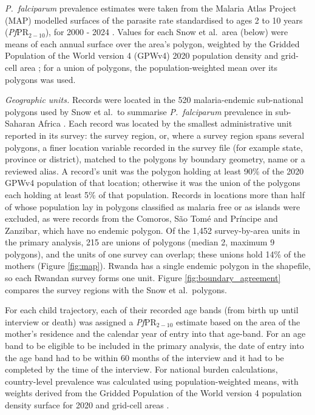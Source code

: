 \documentclass[12pt]{article}
\begin{document}
\emph{P.\ falciparum} prevalence estimates were taken from the Malaria Atlas Project (MAP) modelled surfaces of the parasite rate standardised to ages 2 to 10 years (\textit{Pf}PR$_{2-10}$), for 2000 - 2024 \cite{map,map2025}. Values for each Snow et al.\ area (below) were means of each annual surface over the area's polygon, weighted by the Gridded Population of the World version 4 (GPWv4) 2020 population density and grid-cell area \cite{gpwv4}; for a union of polygons, the population-weighted mean over its polygons was used.

\textit{Geographic units.} Records were located in the 520 malaria-endemic sub-national polygons used by Snow et al.\ to summarise \textit{P.\ falciparum} prevalence in sub-Saharan Africa \cite{snow:17}. Each record was located by the smallest administrative unit reported in its survey: the survey region, or, where a survey region spans several polygons, a finer location variable recorded in the survey file (for example state, province or district), matched to the polygons by boundary geometry, name or a reviewed alias. A record's unit was the polygon holding at least 90\% of the 2020 GPWv4 population of that location; otherwise it was the union of the polygons each holding at least 5\% of that population. Records in locations more than half of whose population lay in polygons classified as malaria free or as islands were excluded, as were records from the Comoros, São Tomé and Príncipe and Zanzibar, which have no endemic polygon. Of the 1,452 survey-by-area units in the primary analysis, 215 are unions of polygons (median 2, maximum 9 polygons), and the units of one survey can overlap; these unions hold 14\% of the mothers (Figure \ref{fig:map}). Rwanda has a single endemic polygon in the shapefile, so each Rwandan survey forms one unit. Figure \ref{fig:boundary_agreement} compares the survey regions with the Snow et al.\ polygons.

For each child trajectory, each of their recorded age bands (from birth up until interview or death) was assigned a \textit{Pf}PR$_{2-10}$ estimate based on the area of the mother's residence and the calendar year of entry into that age-band. For an age band to be eligible to be included in the primary analysis, the date of entry into the age band had to be within 60 months of the interview and it had to be completed by the time of the interview.
For national burden calculations, country-level prevalence was calculated using population-weighted means, with weights derived from the Gridded Population of the World version 4 population density surface for 2020 and grid-cell areas \cite{gpwv4}.
\end{document}
